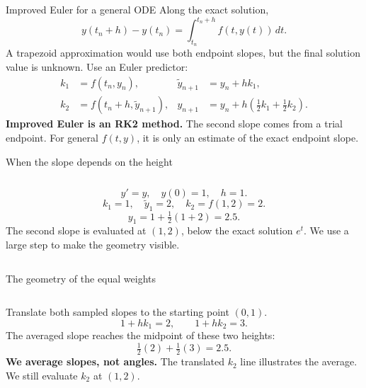 \documentclass[aspectratio=169]{beamer}
\newcommand{\axes}{
\draw[->] (-.08,.75)--(1.25,.75) node[right]{$t$};
\draw[->] (0,.75)--(0,3.2) node[above]{$y$};
\foreach \x in {.5,1}{\draw (\x,.72)--(\x,.78) node[below=3pt] {\scriptsize\x};}
\foreach \y in {1,2,3}{\draw (-.015,\y)--(.015,\y) node[left=3pt]{\scriptsize\y};}
\draw[gray,dotted] (1,.8)--(1,3.05);
}
\newcommand{\expcurve}{\draw[black,thick,domain=0:1.04,samples=50] plot(\x,{exp(\x)});}
\begin{document}
\begin{frame}{Improved Euler for a general ODE}
Along the exact solution,
\[y(t_n+h)-y(t_n)=\int_{t_n}^{t_n+h}f(t,y(t))\,dt.\]
A trapezoid approximation would use both endpoint slopes, but the final solution value is unknown. Use an Euler predictor:
\begin{align*}
k_1&=f(t_n,y_n), & \widetilde y_{n+1}&=y_n+hk_1,\\
k_2&=f(t_n+h,\widetilde y_{n+1}), &
y_{n+1}&=y_n+h\left(\tfrac12 k_1+\tfrac12 k_2\right).
\end{align*}
\textbf{Improved Euler is an RK2 method.} The second slope comes from a trial endpoint. For general $f(t,y)$, it is only an estimate of the exact endpoint slope.
\end{frame}
\begin{frame}{When the slope depends on the height}
\begin{columns}
\[y'=y,\quad y(0)=1,\quad h=1.\]
\[k_1=1,\quad \widetilde y_1=2,\quad k_2=f(1,2)=2.\]
\[y_1=1+\tfrac12(1+2)=2.5.\]
The second slope is evaluated at $(1,2)$, below the exact solution $e^t$.
\medskip
We use a large step to make the geometry visible.
\end{columns}
\end{frame}
\begin{frame}{The geometry of the equal weights}
\begin{columns}
Translate both sampled slopes to the starting point $(0,1)$.
\[1+hk_1=2,\qquad 1+hk_2=3.\]
The averaged slope reaches the midpoint of these two heights:
\[\tfrac12(2)+\tfrac12(3)=2.5.\]
\textbf{We average slopes, not angles.}
The translated $k_2$ line illustrates the average. We still evaluate $k_2$ at $(1,2)$.
\end{columns}
\end{frame}
\end{document}
